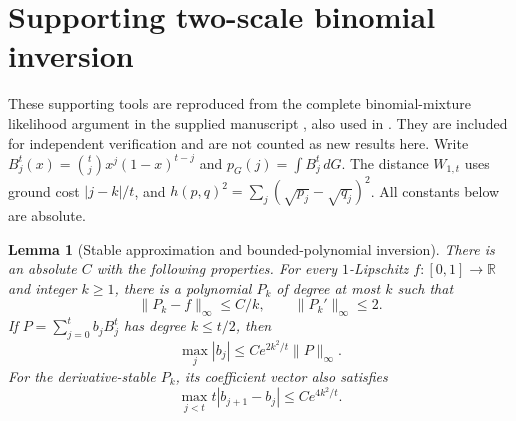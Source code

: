 \documentclass[11pt,a4paper]{article}
\newtheorem{lemma}[theorem]{Lemma}
\theoremstyle{definition}
\theoremstyle{remark}
\numberwithin{equation}{section}
\newcommand{\collectedappendix}{%
 \setcounter{section}{0}%
 \renewcommand{\thesection}{\Roman{part}.\Alph{section}}%
 \renewcommand{\theHsection}{p\arabic{part}.a\arabic{section}}%
}
\begin{document}
\clearpage
\collectedappendix
\section{Supporting two-scale binomial inversion}
\label{p4:sec:binomial-tools}
These supporting tools are reproduced from the complete binomial-mixture
likelihood argument in the supplied manuscript \cite{p4:Keio029}, also used
in \cite{p4:KeioEntropy2026}. They are included for independent verification
and are not counted as new results here.
Write $B_j^t(x)=\binom tjx^j(1-x)^{t-j}$ and
$p_G(j)=\int B_j^t\,dG$. The distance $W_{1,t}$ uses ground cost
$|j-k|/t$, and $h(p,q)^2=\sum_j(\sqrt{p_j}-\sqrt{q_j})^2$.
All constants below are absolute.

\begin{lemma}[Stable approximation and bounded-polynomial inversion]
\label{p4:ET:bc:approx}
There is an absolute $C$ with the following properties.
For every $1$-Lipschitz $f:[0,1]\to\mathbb R$ and integer $k\ge1$, there
is a polynomial $P_k$ of degree at most $k$ such that
\[
 \|P_k-f\|_\infty\le C/k,\qquad \|P_k'\|_\infty\le2.
\]
If $P=\sum_{j=0}^t b_jB_j^t$ has degree $k\le t/2$, then
\begin{equation}\label{p4:ET:bc:coeff}
 \max_j|b_j|\le Ce^{2k^2/t}\|P\|_\infty.
\end{equation}
For the derivative-stable $P_k$, its coefficient vector also satisfies
\begin{equation}\label{p4:ET:bc:coefflip}
 \max_{j<t}t|b_{j+1}-b_j|\le Ce^{4k^2/t}.
\end{equation}
\end{lemma}
\end{document}
